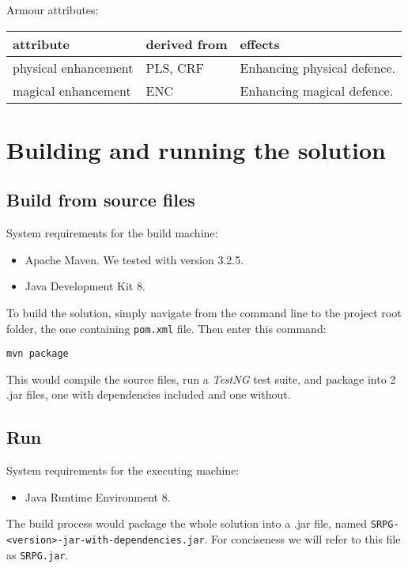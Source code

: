 \bigskip
Armour attributes:

\begin{tabu}{X[l2] X[l2] X[l4] }
	\toprule
	attribute & derived from & effects \\ 
	\midrule
	physical enhancement & PLS, CRF & Enhancing physical defence.\\
	\addlinespace[0.2cm]
	magical enhancement & ENC & Enhancing magical defence.\\
	\bottomrule
\end{tabu}

\chapter{Building and running the solution}

\section{Build from source files}

System requirements for the build machine:
\begin{itemize}
	\item Apache Maven. We tested with version 3.2.5.
	\item Java Development Kit 8.
\end{itemize}

To build the solution, simply navigate from the command line to the project root folder, the one containing \texttt{pom.xml} file. Then enter this command:
\begin{tcolorbox}
	\texttt{mvn package}
\end{tcolorbox}
This would compile the source files, run a \textit{TestNG} test suite, and package into 2 .jar files, one with dependencies included and one without.

\section{Run}

System requirements for the executing machine:
\begin{itemize}
	\item Java Runtime Environment 8.
\end{itemize}

The build process would package the whole solution into a .jar file, named \texttt{SRPG-<version>-jar-with-dependencies.jar}. For conciseness we will refer to this file as \texttt{SRPG.jar}.

